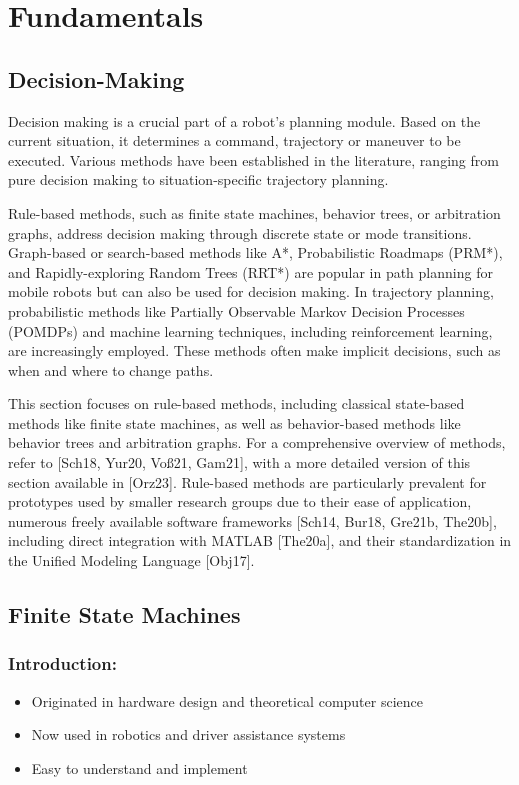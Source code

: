 
\section{Fundamentals}

\subsection{Decision-Making}

Decision making is a crucial part of a robot's planning module.
Based on the current situation, it determines a command, trajectory or maneuver to be executed.
Various methods have been established in the literature, ranging from pure decision making to situation-specific trajectory planning.

Rule-based methods, such as finite state machines, behavior trees, or arbitration graphs, address decision making through discrete state or mode transitions.
Graph-based or search-based methods like A*, Probabilistic Roadmaps (PRM*), and Rapidly-exploring Random Trees (RRT*) are popular in path planning for mobile robots but can also be used for decision making.
In trajectory planning, probabilistic methods like Partially Observable Markov Decision Processes (POMDPs) and machine learning techniques, including reinforcement learning, are increasingly employed.
These methods often make implicit decisions, such as when and where to change paths.

This section focuses on rule-based methods, including classical state-based methods like finite state machines, as well as behavior-based methods like behavior trees and arbitration graphs.
For a comprehensive overview of methods, refer to [Sch18, Yur20, Voß21, Gam21], with a more detailed version of this section available in [Orz23].
Rule-based methods are particularly prevalent for prototypes used by smaller research groups due to their ease of application, numerous freely available software frameworks [Sch14, Bur18, Gre21b, The20b], including direct integration with MATLAB [The20a], and their standardization in the Unified Modeling Language [Obj17].

\subsection{Finite State Machines}

\subsubsection*{Introduction:}
\begin{itemize}
    \item Originated in hardware design and theoretical computer science
    \item Now used in robotics and driver assistance systems
    \item Easy to understand and implement
\end{itemize}

